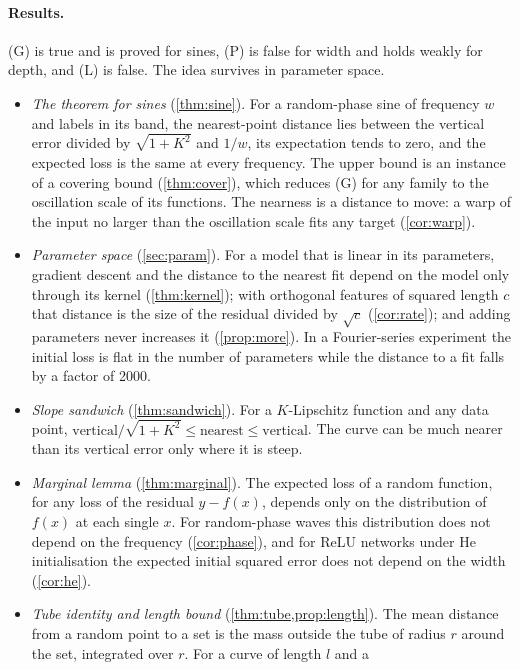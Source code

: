 \paragraph{Results.} (G) is true and is proved for sines, (P) is false for width
and holds weakly for depth, and (L) is false. The idea survives in parameter
space.
\begin{itemize}\setlength{\itemsep}{0pt}
\item \emph{The theorem for sines} (\cref{thm:sine}). For a random-phase sine of
frequency $w$ and labels in its band, the nearest-point distance lies between
the vertical error divided by $\sqrt{1+K^2}$ and $1/w$, its expectation tends
to zero, and the expected loss is the same at every frequency. The upper bound
is an instance of a covering bound (\cref{thm:cover}), which reduces (G) for any
family to the oscillation scale of its functions. The nearness is a distance
to move: a warp of the input no larger than the oscillation scale fits any
target (\cref{cor:warp}).
\item \emph{Parameter space} (\cref{sec:param}). For a model that is linear in
its parameters, gradient descent and the distance to the nearest fit depend on
the model only through its kernel (\cref{thm:kernel}); with orthogonal features
of squared length $c$ that distance is the size of the residual divided by
$\sqrt c$ (\cref{cor:rate}); and adding parameters never increases it
(\cref{prop:more}). In a Fourier-series experiment the initial loss is flat in
the number of parameters while the distance to a fit falls by a factor of 2000.
\item \emph{Slope sandwich} (\cref{thm:sandwich}). For a $K$-Lipschitz function
and any data point, $\text{vertical}/\sqrt{1+K^2}\le\text{nearest}\le\text{vertical}$.
The curve can be much nearer than its vertical error only where it is steep.
\item \emph{Marginal lemma} (\cref{thm:marginal}). The expected loss of a random
function, for any loss of the residual $y-f(x)$, depends only on the
distribution of $f(x)$ at each single $x$. For random-phase waves this
distribution does not depend on the frequency (\cref{cor:phase}), and for ReLU
networks under He initialisation the expected initial squared error does not
depend on the width (\cref{cor:he}).
\item \emph{Tube identity and length bound} (\cref{thm:tube,prop:length}). The
mean distance from a random point to a set is the mass outside the tube of
radius $r$ around the set, integrated over $r$. For a curve of length $l$ and a

\end{itemize}
